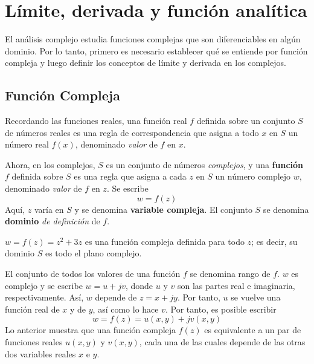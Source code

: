 \section{Límite, derivada y función analítica}

El análisis complejo estudia funciones complejas que son diferenciables en algún dominio. Por lo tanto, primero es necesario establecer qué se entiende por función compleja y luego definir los conceptos de límite y derivada en los complejos.

\subsection{Función Compleja}

Recordando las funciones reales, una función real $f$ definida sobre un conjunto $S$ de números reales es una regla de correspondencia que asigna a todo $x$ en $S$ un número real $f(x)$, denominado \textit{valor} de $f$ en $x$.

Ahora, en los complejos, $S$ es un conjunto de números \textit{complejos}, y una \textbf{función} $f$ definida sobre $S$ es una regla que asigna a cada $z$ en $S$ un número complejo $w$, denominado \textit{valor} de $f$ en $z$. Se escribe
\begin{equation*}
  w=f(z)
\end{equation*}
Aquí, $z$ varía en $S$ y se denomina \textbf{variable compleja}. El conjunto $S$ se denomina \textbf{dominio} \textit{de definición} de $f$.

\begin{example}
  $w=f(z)=z^2+3z$ es una función compleja definida para todo $z$; es decir, su dominio $S$ es todo el plano complejo.
\end{example}

El conjunto de todos los valores de una función $f$ se denomina rango de $f$. $w$ es complejo y se escribe $w=u+jv$, donde $u$ y $v$ son las partes real e imaginaria, respectivamente. Así, $w$ depende de $z=x+jy$. Por tanto, $u$ se vuelve una función real de $x$ y de $y$, así como lo hace $v$. Por tanto, es posible escribir
\begin{equation*}
  \boxed{w=f(z)=u(x,y)+jv(x,y)}
\end{equation*}
Lo anterior muestra que una función compleja $f(z)$ es equivalente a un par de funciones reales $u(x,y)$ y $v(x,y)$, cada una de las cuales depende de las otras dos variables reales $x$ e $y$.
